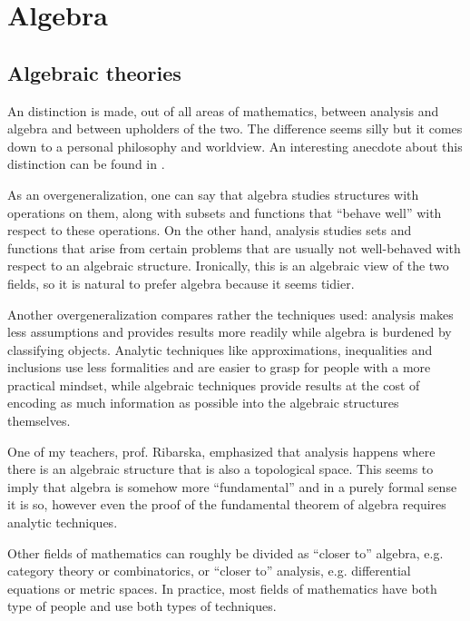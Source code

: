 \section{Algebra}\label{sec:algebra}
\subsection{Algebraic theories}\label{subsec:algebraic_theories}

\begin{remark}\label{remark:algebra_vs_analysis}
  An distinction is made, out of all areas of mathematics, between analysis and algebra and between upholders of the two. The difference seems silly but it comes down to a personal philosophy and worldview. An interesting anecdote about this distinction can be found in \cite{Tilly2010}.

  As an overgeneralization, one can say that algebra studies structures with operations on them, along with subsets and functions that \enquote{behave well} with respect to these operations. On the other hand, analysis studies sets and functions that arise from certain problems that are usually not well-behaved with respect to an algebraic structure. Ironically, this is an algebraic view of the two fields, so it is natural to prefer algebra because it seems tidier.

  Another overgeneralization compares rather the techniques used: analysis makes less assumptions and provides results more readily while algebra is burdened by classifying objects. Analytic techniques like approximations, inequalities and inclusions use less formalities and are easier to grasp for people with a more practical mindset, while algebraic techniques provide results at the cost of encoding as much information as possible into the algebraic structures themselves.

  One of my teachers, prof. Ribarska, emphasized that analysis happens where there is an algebraic structure that is also a topological space. This seems to imply that algebra is somehow more \enquote{fundamental} and in a purely formal sense it is so, however even the proof of the fundamental theorem of algebra requires analytic techniques.

  Other fields of mathematics can roughly be divided as \enquote{closer to} algebra, e.g. category theory or combinatorics, or \enquote{closer to} analysis, e.g. differential equations or metric spaces. In practice, most fields of mathematics have both type of people and use both types of techniques.
\end{remark}

